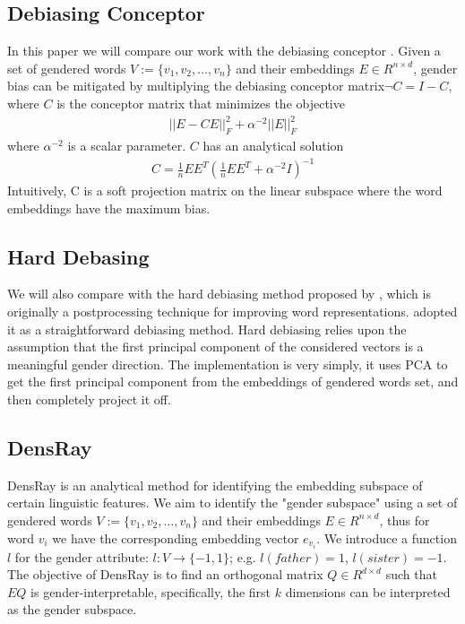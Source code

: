\subsection{Debiasing Conceptor}
In this paper we will compare our work with the debiasing conceptor \cite{karve2019conceptor}. Given a set of gendered words $V:=\{v_1,v_2,\dots,v_n\}$ and their embeddings $E \in R^{n\times d}$, gender bias can be mitigated by multiplying the debiasing conceptor matrix$\neg C= I-C$, where $C$ is the conceptor matrix that minimizes the objective
\begin{eqnarray}
||E-CE||^2_F+\alpha^{-2}||E||^2_F
\end{eqnarray}
where $\alpha^{-2}$ is a scalar parameter. $C$ has an analytical solution
\begin{eqnarray}
C=\frac{1}{n}EE^T(\frac{1}{n}EE^T+\alpha^{-2}I)^{-1}
\end{eqnarray}
Intuitively, C is a soft projection matrix on the linear subspace where the word embeddings have the maximum bias.
\subsection{Hard Debasing}
We will also compare with the hard debiasing method proposed by \cite{mu2018all}, which is originally a postprocessing technique for improving word representations. \cite{karve2019conceptor} adopted it as a straightforward debiasing method. Hard debiasing relies upon the assumption that the first principal component of the considered vectors is a meaningful gender direction. The implementation is very simply, it uses PCA to get the first principal component from the embeddings of gendered words set, and then completely project it off.

\subsection{DensRay}
DensRay is an analytical method for identifying the
embedding subspace of certain linguistic features. We aim to
identify the "gender subspace" using a set of gendered words
$V:=\{v_1,v_2,\dots,v_n\}$ and their embeddings $E \in
R^{n\times d}$, thus for word $v_i$ we have the
corresponding embedding vector $e_{v_i}$. We
introduce a function $l$ for the gender attribute:
$l:V\to \{-1,1\}$;
e.g. $l(father)=1$, $l(sister)=-1$. The objective of DensRay
is to find an orthogonal matrix $Q\in R^{d\times d}$ such
that $EQ$ is gender-interpretable, specifically, the first
$k$ dimensions can be interpreted as the gender subspace.

